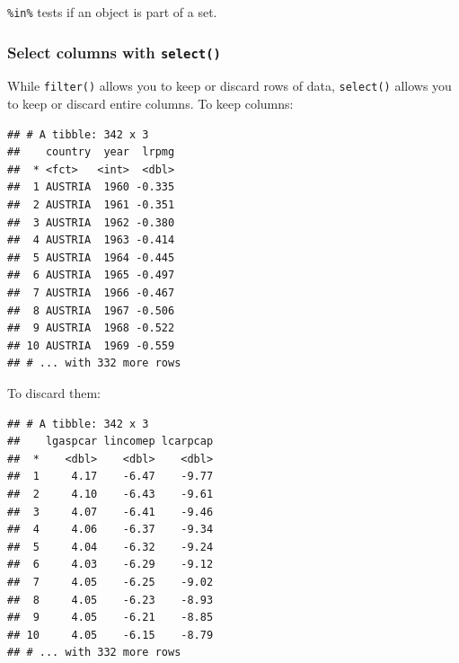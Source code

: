 \documentclass[]{gitbook}
\newenvironment{Shaded}{\begin{snugshade}}{\end{snugshade}}
\newcommand{\KeywordTok}[1]{\textcolor[rgb]{0.13,0.29,0.53}{\textbf{#1}}}
\newcommand{\NormalTok}[1]{#1}
\newcommand{\OperatorTok}[1]{\textcolor[rgb]{0.81,0.36,0.00}{\textbf{#1}}}
\newcommand{\StringTok}[1]{\textcolor[rgb]{0.31,0.60,0.02}{#1}}
\theoremstyle{definition}
\theoremstyle{definition}
\theoremstyle{definition}
\theoremstyle{remark}
\begin{document}
\texttt{\%in\%} tests if an object is part of a set.

\hypertarget{select-columns-with-select}{%
\subsubsection{\texorpdfstring{Select columns with
\texttt{select()}}{Select columns with select()}}\label{select-columns-with-select}}

While \texttt{filter()} allows you to keep or discard rows of data,
\texttt{select()} allows you to keep or discard entire columns. To keep
columns:

\begin{Shaded}
\end{Shaded}

\begin{verbatim}
## # A tibble: 342 x 3
##    country  year  lrpmg
##  * <fct>   <int>  <dbl>
##  1 AUSTRIA  1960 -0.335
##  2 AUSTRIA  1961 -0.351
##  3 AUSTRIA  1962 -0.380
##  4 AUSTRIA  1963 -0.414
##  5 AUSTRIA  1964 -0.445
##  6 AUSTRIA  1965 -0.497
##  7 AUSTRIA  1966 -0.467
##  8 AUSTRIA  1967 -0.506
##  9 AUSTRIA  1968 -0.522
## 10 AUSTRIA  1969 -0.559
## # ... with 332 more rows
\end{verbatim}

To discard them:

\begin{Shaded}
\end{Shaded}

\begin{verbatim}
## # A tibble: 342 x 3
##    lgaspcar lincomep lcarpcap
##  *    <dbl>    <dbl>    <dbl>
##  1     4.17    -6.47    -9.77
##  2     4.10    -6.43    -9.61
##  3     4.07    -6.41    -9.46
##  4     4.06    -6.37    -9.34
##  5     4.04    -6.32    -9.24
##  6     4.03    -6.29    -9.12
##  7     4.05    -6.25    -9.02
##  8     4.05    -6.23    -8.93
##  9     4.05    -6.21    -8.85
## 10     4.05    -6.15    -8.79
## # ... with 332 more rows
\end{verbatim}
\end{document}
